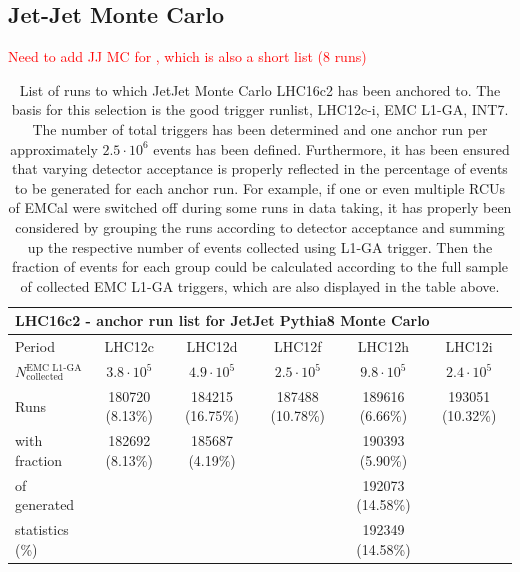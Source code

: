 \newpage

\subsection{Jet-Jet Monte Carlo}	
\label{subsec:runsJJMC}
\textcolor{red}{Need to add JJ MC for \pPb, which is also a short list (8 runs)}
	
\begin{table}[h!]
	\hspace*{-0.2cm}
	\small
	\centering
	\begin{tabular}{lccccc}  
	    \toprule
		\multicolumn{6}{l}{\textbf{LHC16c2 - anchor run list for JetJet Pythia8 Monte Carlo}} \\ \midrule
		Period & LHC12c & LHC12d & LHC12f & LHC12h & LHC12i\\
		$N^{\text{EMC L1-GA}}_{\text{collected}}$ & $3.8 \cdot 10^{5}$ & $4.9 \cdot 10^{5}$ & $2.5 \cdot 10^{5}$ & $9.8 \cdot 10^{5}$ & $2.4 \cdot 10^{5}$\\ \midrule
		Runs 			 & 180720 (8.13\%) & 184215 (16.75\%) & 187488 (10.78\%) & 189616 (6.66\%) & 193051 (10.32\%) \\
		with fraction	 & 182692 (8.13\%) & 185687 (4.19\%) &  & 190393 (5.90\%) &  \\
		of generated	 &  &  &  & 192073 (14.58\%) &  \\
		statistics (\%)	 &  &  &  & 192349 (14.58\%) &  \\
		\bottomrule
	\end{tabular}
	\caption{List of runs to which JetJet Monte Carlo LHC16c2 has been anchored to. The basis for this selection is the good trigger runlist, LHC12c-i, EMC L1-GA, INT7. The number of total triggers has been determined and one anchor run per approximately $ 2.5 \cdot 10^{6}$ events has been defined. Furthermore, it has been ensured that varying detector acceptance is properly reflected in the percentage of events to be generated for each anchor run. For example, if one or even multiple RCUs of EMCal were switched off during some runs in data taking, it has properly been considered by grouping the runs according to detector acceptance and summing up the respective number of events collected using L1-GA trigger. Then the fraction of events for each group could be calculated according to the full sample of collected EMC L1-GA triggers, which are also displayed in the table above.}
	\label{tab:runsJetJet}
\end{table}

\newpage
	
